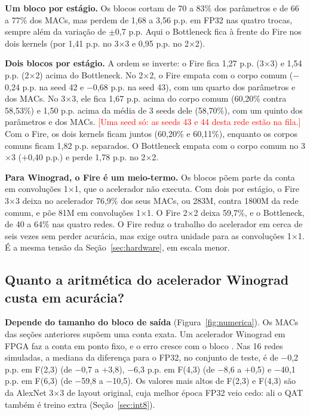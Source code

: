 \documentclass[conference]{IEEEtran}
\newcommand{\pendente}[1]{\textcolor{red}{[#1]}}
\newcommand{\by}{\ensuremath{\times}}
\begin{document}
\textbf{Um bloco por estágio.} Os blocos cortam de 70 a 83\% dos parâmetros e de 66 a 77\% dos MACs, mas perdem de 1,68 a 3,56 p.p. em FP32 nas quatro trocas, sempre além da variação de $\pm$0,7 p.p. Aqui o Bottleneck fica à frente do Fire nos dois kernels (por 1,41 p.p. no 3\by3 e 0,95 p.p. no 2\by2).

\textbf{Dois blocos por estágio.} A ordem se inverte: o Fire fica 1,27 p.p. (3\by3) e 1,54 p.p. (2\by2) acima do Bottleneck. No 2\by2, o Fire empata com o corpo comum ($-$0,24 p.p. na seed 42 e $-$0,68 p.p. na seed 43), com um quarto dos parâmetros e dos MACs. No 3\by3, ele fica 1,67 p.p. acima do corpo comum (60,20\% contra 58,53\%) e 1,50 p.p. acima da média de 3 seeds dele (58,70\%), com um quinto dos parâmetros e dos MACs. \pendente{Uma seed só: as seeds 43 e 44 desta rede estão na fila.} Com o Fire, os dois kernels ficam juntos (60,20\% e 60,11\%), enquanto os corpos comuns ficam 1,82 p.p. separados. O Bottleneck empata com o corpo comum no 3\by3 ($+$0,40 p.p.) e perde 1,78 p.p. no 2\by2.

\textbf{Para Winograd, o Fire é um meio-termo.} Os blocos põem parte da conta em convoluções 1\by1, que o acelerador não executa. Com dois por estágio, o Fire 3\by3 deixa no acelerador 76,9\% dos seus MACs, ou 283M, contra 1800M da rede comum, e põe 81M em convoluções 1\by1. O Fire 2\by2 deixa 59,7\%, e o Bottleneck, de 40 a 64\% nas quatro redes. O Fire reduz o trabalho do acelerador em cerca de seis vezes sem perder acurácia, mas exige outra unidade para as convoluções 1\by1. É a mesma tensão da Seção~\ref{sec:hardware}, em escala menor.

\FloatBarrier

\subsection{Quanto a aritmética do acelerador Winograd custa em acurácia?}
\label{sec:numerica}

\textbf{Depende do tamanho do bloco de saída} (Figura~\ref{fig:numerica}). Os MACs das seções anteriores supõem uma conta exata. Um acelerador
Winograd em FPGA faz a conta em ponto fixo, e o erro cresce com o bloco \cite{barabasz2020error}. Nas 16 redes simuladas, a mediana da diferença
para o FP32, no conjunto de teste, é de $-$0,2 p.p. em F(2,3) (de $-$0,7 a $+$3,8), $-$6,3 p.p. em F(4,3) (de $-$8,6 a $+$0,5) e $-$40,1 p.p. em F(6,3)
(de $-$59,8 a $-$10,5). Os valores mais altos de F(2,3) e F(4,3) são da AlexNet 3\by3 de layout original, cuja melhor época FP32 veio cedo: ali o QAT
também é treino extra (Seção~\ref{sec:int8}).
\end{document}
